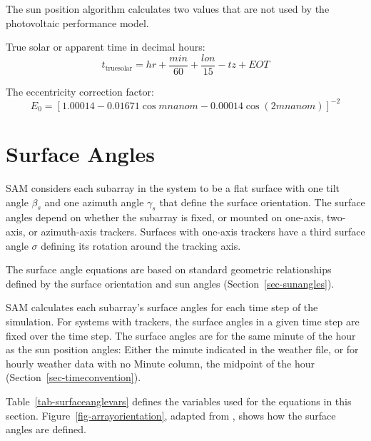 \documentclass[12pt,letterpaper]{article}
\begin{document}
The sun position algorithm calculates two values that are not used by the photovoltaic performance model. 

True solar or apparent time in decimal hours:
\begin{equation}
t_{\mathrm{truesolar}} = \mathit{hr} + \frac{min}{60} + \frac{\mathit{lon}}{15} - \mathit{tz} + \mathit{EOT}
\end{equation}

The eccentricity correction factor:
\begin{equation}
E_0 = [ 1.00014 - 0.01671\cos\mathit{mnanom} - 0.00014\cos(2\mathit{mnanom}) ]^{-2}
\end{equation}

\chapter{Surface Angles}\label{sec-surfaceangles}

SAM considers each subarray in the system to be a flat surface with one tilt angle $\beta_s$ and one azimuth angle $\gamma_s$ that define the surface orientation. The surface angles depend on whether the subarray is fixed, or mounted on one-axis, two-axis, or azimuth-axis trackers. Surfaces with one-axis trackers have a third surface angle $\sigma$ defining its rotation around the tracking axis.

The surface angle equations are based on standard geometric relationships defined by the surface orientation and sun angles (Section~\ref{sec-sunangles}).

SAM calculates each subarray's surface angles for each time step of the simulation. For systems with trackers, the surface angles in a given time step are fixed over the time step. The surface angles are for the same minute of the hour as the sun position angles: Either the minute indicated in the weather file, or for hourly weather data with no Minute column, the midpoint of the hour (Section~\ref{sec-timeconvention}).

Table~\ref{tab-surfaceanglevars} defines the variables used for the equations in this section. Figure~\ref{fig-arrayorientation}, adapted from \citet{dunlap2007}, shows how the surface angles are defined.

\end{document}
